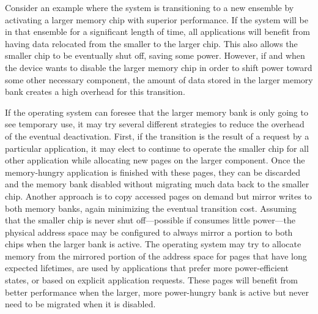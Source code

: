Consider an example where the system is transitioning to a new ensemble by
activating a larger memory chip with superior performance. If the system will
be in that ensemble for a significant length of time, all applications will
benefit from having data relocated from the smaller to the larger chip. This
also allows the smaller chip to be eventually shut off, saving some power.
However, if and when the device wants to disable the larger memory chip in
order to shift power toward some other necessary component, the amount of
data stored in the larger memory bank creates a high overhead for this
transition.

If the operating system can foresee that the larger memory bank is only going
to see temporary use, it may try several different strategies to reduce the
overhead of the eventual deactivation. First, if the transition is the result
of a request by a particular application, it may elect to continue to operate
the smaller chip for all other application while allocating new pages on the
larger component. Once the memory-hungry application is finished with these
pages, they can be discarded and the memory bank disabled without migrating
much data back to the smaller chip. Another approach is to copy accessed
pages on demand but mirror writes to both memory banks, again minimizing the
eventual transition cost. Assuming that the smaller chip is never shut off---possible if consumes little power---the physical address space may be
configured to always mirror a portion to both chips when the larger bank is
active. The operating system may try to allocate memory from the mirrored
portion of the address space for pages that have long expected lifetimes, are
used by applications that prefer more power-efficient states, or based on
explicit application requests. These pages will benefit from better
performance when the larger, more power-hungry bank is active but never need
to be migrated when it is disabled.
